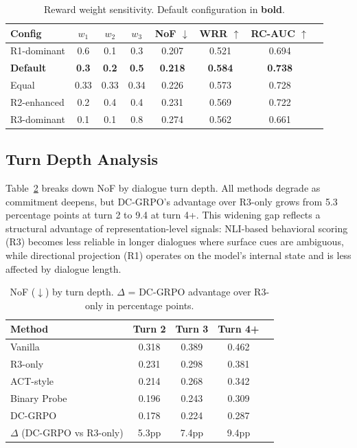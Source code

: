 \documentclass[11pt,a4paper]{article}
\begin{document}
\begin{table}[t]
\centering
\caption{Reward weight sensitivity. Default configuration in \textbf{bold}.}
\label{tab:weights}
\small
\begin{tabular}{lccccccc}
\toprule
Config & $w_1$ & $w_2$ & $w_3$ & NoF $\downarrow$ & WRR $\uparrow$ & RC-AUC $\uparrow$ \\
\midrule
R1-dominant & 0.6 & 0.1 & 0.3 & 0.207 & 0.521 & 0.694 \\
\textbf{Default} & \textbf{0.3} & \textbf{0.2} & \textbf{0.5} & \textbf{0.218} & \textbf{0.584} & \textbf{0.738} \\
Equal       & 0.33 & 0.33 & 0.34 & 0.226 & 0.573 & 0.728 \\
R2-enhanced & 0.2 & 0.4 & 0.4 & 0.231 & 0.569 & 0.722 \\
R3-dominant & 0.1 & 0.1 & 0.8 & 0.274 & 0.562 & 0.661 \\
\bottomrule
\end{tabular}
\end{table}

\subsection{Turn Depth Analysis}
\label{sec:turn_depth}

Table~\ref{tab:turndepth} breaks down NoF by dialogue turn depth. All methods degrade as commitment deepens, but DC-GRPO's advantage over R3-only grows from 5.3 percentage points at turn 2 to 9.4 at turn 4+. This widening gap reflects a structural advantage of representation-level signals: NLI-based behavioral scoring (R3) becomes less reliable in longer dialogues where surface cues are ambiguous, while directional projection (R1) operates on the model's internal state and is less affected by dialogue length.

\begin{table}[t]
\centering
\caption{NoF ($\downarrow$) by turn depth. $\Delta$ = DC-GRPO advantage over R3-only in percentage points.}
\label{tab:turndepth}
\small
\begin{tabular}{lcccc}
\toprule
Method & Turn 2 & Turn 3 & Turn 4+ \\
\midrule
Vanilla     & 0.318 & 0.389 & 0.462 \\
R3-only     & 0.231 & 0.298 & 0.381 \\
ACT-style   & 0.214 & 0.268 & 0.342 \\
Binary Probe & 0.196 & 0.243 & 0.309 \\
DC-GRPO     & 0.178 & 0.224 & 0.287 \\
\midrule
$\Delta$ (DC-GRPO vs R3-only) & 5.3pp & 7.4pp & 9.4pp \\
\bottomrule
\end{tabular}
\end{table}
\end{document}
